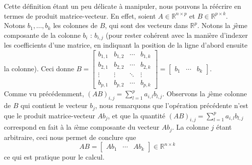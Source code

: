 \documentclass{article}
\newcommand{\R}{\mathbb{R}}
\newcommand{\cross}{\times}
\begin{document}
\noindent Cette définition étant un peu délicate à manipuler, nous pouvons la réécrire en termes de produit matrice-vecteur. En effet, soient $A \in \R^{n \cross p}$ et $B\in \R^{p \cross k}$. Notons $b_1, ..., b_k$ les colonnes de $B$, qui sont des vecteurs dans $\R^p$. Notons la $j$ème composante de la colonne $b_i$ : $b_{i,j}$ (pour rester cohérent avec la manière d'indexer les coefficients d'une matrice, en indiquant la position de la ligne d'abord ensuite la colonne). Ceci donne $B = 
\begin{bmatrix} 
b_{1,1} & b_{1,2} & \cdots & b_{1,k} \\
b_{2,1} & b_{2,2} & \cdots & b_{2,k} \\
\vdots & \vdots & \ddots & \vdots \\
b_{p,1} & b_{p,2} & \cdots & b_{p,k}
\end{bmatrix} = \begin{bmatrix} b_1 & \cdots & b_k \end{bmatrix}$. \\
Comme vu précédemment, $\displaystyle (AB)_{i,j} = \sum_{l=1}^{p} a_{i,l} b_{l,j}$. Observons la $j$ème colonne de $B$ qui contient le vecteur $b_j$, nous remarquons que l'opération précédente n'est que le produit matrice-vecteur $A b_j$, et que la quantité $\displaystyle (AB)_{i,j} = \sum_{l=1}^{p} a_{i,l} b_{l,j}$ correspond en fait à la $i$ème composante du vecteur $Ab_j$. La colonne $j$ étant arbitraire, ceci nous permet de conclure que 
$$AB = \begin{bmatrix} Ab_1 & \cdots & Ab_k \end{bmatrix} \in \R^{n \cross k}$$ 
ce qui est pratique pour le calcul. \\
\end{document}
